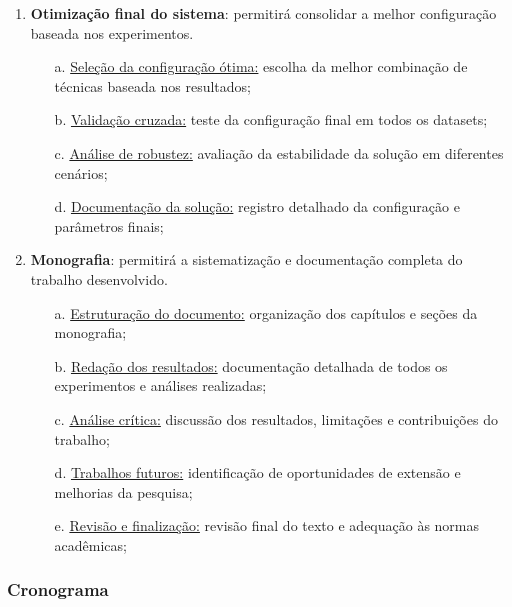\documentclass[a4paper,12pt,brazil]{article} %
\begin{document}
\begin{enumerate}
    \item \textbf{Otimização final do sistema}: permitirá consolidar a melhor configuração baseada nos experimentos.
    \begin{enumerate}
        \item[a.] \underline{Seleção da configuração ótima:} escolha da melhor combinação de técnicas baseada nos resultados;
        \item[b.] \underline{Validação cruzada:} teste da configuração final em todos os datasets;
        \item[c.] \underline{Análise de robustez:} avaliação da estabilidade da solução em diferentes cenários;
        \item[d.] \underline{Documentação da solução:} registro detalhado da configuração e parâmetros finais;
    \end{enumerate}
    
    \item \textbf{Monografia}: permitirá a sistematização e documentação completa do trabalho desenvolvido.
    \begin{enumerate}
        \item[a.] \underline{Estruturação do documento:} organização dos capítulos e seções da monografia;
        \item[b.] \underline{Redação dos resultados:} documentação detalhada de todos os experimentos e análises realizadas;
        \item[c.] \underline{Análise crítica:} discussão dos resultados, limitações e contribuições do trabalho;
        \item[d.] \underline{Trabalhos futuros:} identificação de oportunidades de extensão e melhorias da pesquisa;
        \item[e.] \underline{Revisão e finalização:} revisão final do texto e adequação às normas acadêmicas;
    \end{enumerate}
\end{enumerate}


\vspace{15pt}
\subsubsection{Cronograma}
\end{document}
